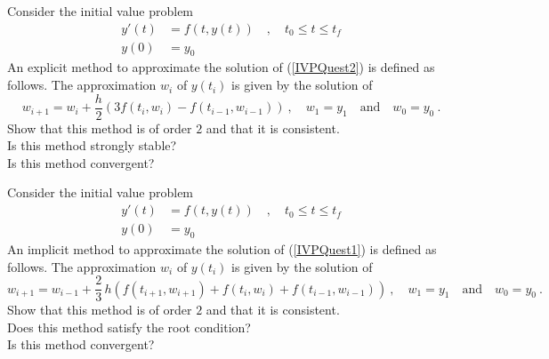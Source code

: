 \begin{question}
Consider the initial value problem
\begin{equation} \label{IVPQuest2}
\begin{split}
y'(t) &= f(t,y(t)) \quad , \quad t_0 \leq t \leq t_f \\
y(0) &= y_0
\end{split}
\end{equation}
An explicit method to approximate the solution of (\ref{IVPQuest2}) is
defined as follows.  The approximation $w_i$ of $y(t_i)$ is given by
the solution of
\[
w_{i+1} = w_i + \frac{h}{2}\left( 3 f(t_i,w_i) - f(t_{i-1},w_{i-1})
\right) \ , \quad
w_1 = y_1 \quad \text{and} \quad w_0 = y_0 \ .
\]
 Show that this method is of order $2$ and that it is
consistent.\\
 Is this method strongly stable?\\
 Is this method convergent?
\label{initQ13}
\end{question}

\begin{question}
Consider the initial value problem
\begin{equation} \label{IVPQuest1}
\begin{split}
y'(t) &= f(t,y(t)) \quad , \quad t_0 \leq t \leq t_f \\
y(0) &= y_0
\end{split}
\end{equation}
An implicit method to approximate the solution of (\ref{IVPQuest1}) is
defined as follows.  The approximation $w_i$ of $y(t_i)$ is given by 
the solution of
\[
w_{i+1} = w_{i-1} + \frac{2}{3} \,h\left( f(t_{i+1},w_{i+1}) +
 f(t_{i},w_{i}) +  f(t_{i-1},w_{i-1}) \right) \ , \quad
w_1 = y_1 \quad \text{and} \quad  w_0 = y_0  \ .
\]
 Show that this method is of order $2$ and that it is
consistent. \\
 Does this method satisfy the root condition?\\
 Is this method convergent?
\label{initQ14}
\end{question}

